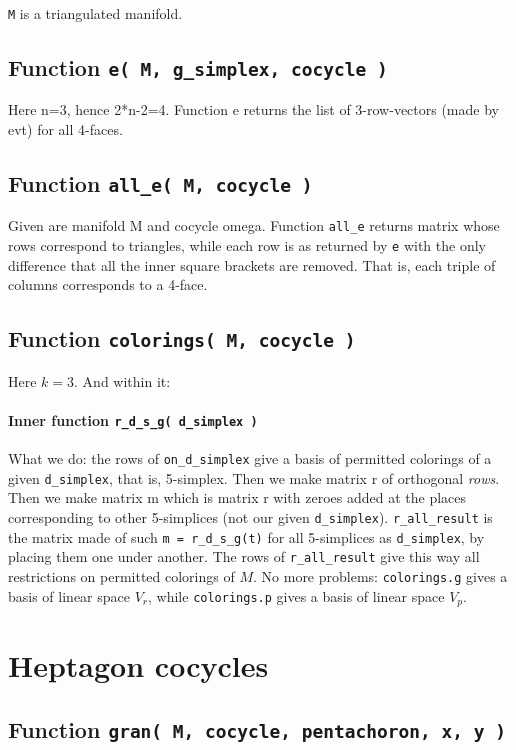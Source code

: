 \documentclass[12pt]{article}
\theoremstyle{definition}
\theoremstyle{remark}
\begin{document}
\texttt{M} is a triangulated manifold.


\subsection{Function \texttt{e( M, g\_simplex, cocycle )}}
Here n=3, hence 2*n-2=4. Function e returns the list of 3-row-vectors (made by evt) for all 4-faces.


\subsection{Function \texttt{all\_e( M, cocycle )}}
Given are manifold M and cocycle omega. Function \texttt{all\_e} returns matrix whose rows correspond to triangles, while each row is as returned by \texttt{e} with the only difference that all the inner square brackets are removed. That is, each triple of columns corresponds to a 4-face.


\subsection{Function \texttt{colorings( M, cocycle )}}
Here $k=3$. 
And within it:
 \paragraph{Inner function \texttt{r\_d\_s\_g( d\_simplex )}}
 What we do: the rows of \texttt{on\_d\_simplex} give a basis of permitted colorings of a given \texttt{d\_simplex}, that is, 5-simplex. Then we make matrix r of orthogonal \emph{rows}. Then we make matrix m which is matrix r with zeroes added at the places corresponding to other 5-simplices (not our given \texttt{d\_simplex}).
\texttt{r\_all\_result} is the matrix made of such \texttt{m = r\_d\_s\_g(t)} for all 5-simplices as \texttt{d\_simplex}, by placing them one under another. The rows of \texttt{r\_all\_result} give this way all restrictions on permitted colorings of $M$.
No more problems: \texttt{colorings.g} gives a basis of linear space $V_r$, while \texttt{colorings.p} gives a basis of linear space $V_p$.



\section{Heptagon cocycles}\label{s:hc}

\subsection{Function \texttt{gran( M, cocycle, pentachoron, x, y )}}
\end{document}
